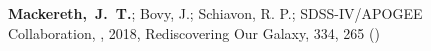 \item[{\scriptsize1}]\textbf{Mackereth,~J.~T.}; Bovy, J.; Schiavon, R. P.; SDSS-IV/APOGEE Collaboration, , 2018, Rediscovering Our Galaxy, {334}, 265 ()